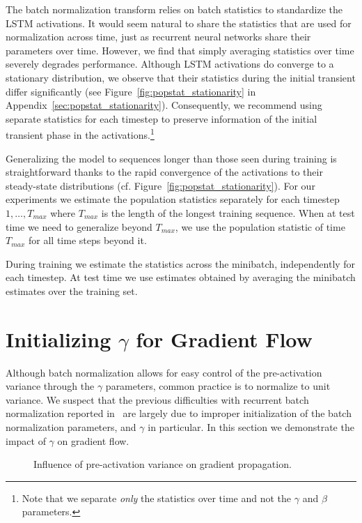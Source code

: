 \documentclass{article} \pdfoutput=1 \usepackage[utf8]{inputenc}
\begin{document}
The batch normalization transform relies on batch statistics to standardize the
LSTM activations.  It would seem natural to share the statistics that are used
for normalization across time, just as recurrent neural networks share their
parameters over time.  However, we find that simply averaging statistics over
time severely degrades performance.  Although LSTM activations do converge to a
stationary distribution, we observe that their statistics during the initial
transient differ significantly (see Figure~\ref{fig:popstat_stationarity} in Appendix~\ref{sec:popstat_stationarity}).
Consequently, we recommend using separate statistics for each timestep to
preserve information of the initial transient phase in the
activations.\footnote{ Note that we separate \emph{only} the statistics over
time and not the $\gamma$ and $\beta$ parameters.}

Generalizing the model to sequences longer than those seen during training is
straightforward thanks to the rapid convergence of the activations to their
steady-state distributions (cf. Figure~\ref{fig:popstat_stationarity}).  For
our experiments we estimate the population statistics separately for each
timestep $1, \ldots, T_{max}$ where $T_{max}$ is the length of the longest
training sequence.  When at test time we need to generalize beyond $T_{max}$,
we use the population statistic of time $T_{max}$ for all time steps beyond it.

During training we estimate the statistics across the minibatch, independently
for each timestep.  At test time we use estimates obtained by averaging the
minibatch estimates over the training set.


\section{Initializing $\gamma$ for Gradient Flow}
\label{sec:activation-variance}

Although batch normalization allows for easy control of the pre-activation
variance through the $\gamma$ parameters, common practice is to normalize to
unit variance.  We suspect that the previous difficulties with recurrent batch
normalization reported in~\citet{cesar,baidu} are largely due to improper
initialization of the batch normalization parameters, and $\gamma$ in
particular.  In this section we demonstrate the impact of $\gamma$ on gradient
flow.


\begin{figure}[!ht]
  \center {}\hspace{2mm}
  \caption{
Influence of pre-activation variance on gradient propagation.
}
  \label{fig:variance}
\end{figure}
\end{document}
